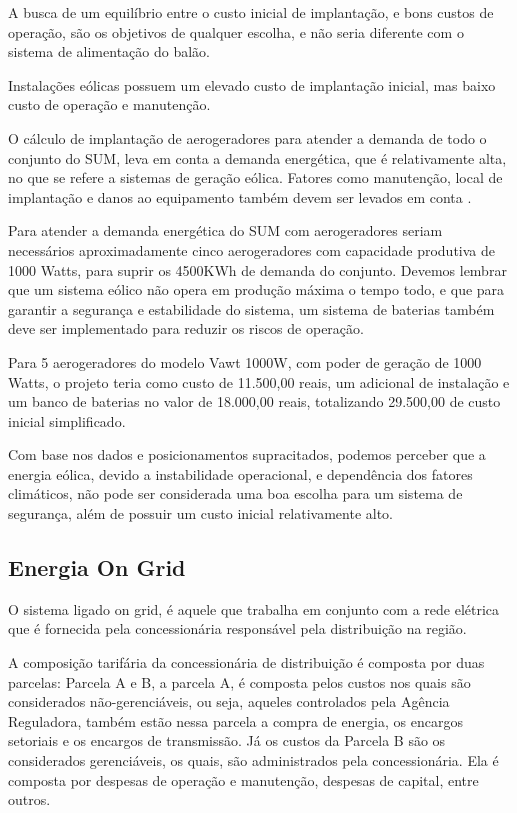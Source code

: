 A busca de um equilíbrio entre o custo inicial de implantação, e bons custos de operação, são os objetivos de qualquer escolha, e não seria diferente com o sistema de alimentação do balão.

Instalações eólicas possuem um elevado custo de implantação inicial, mas baixo custo de operação e manutenção.

O cálculo de implantação de aerogeradores para atender a demanda de todo o conjunto do SUM, leva em conta a demanda energética, que é relativamente alta, no que se refere a sistemas de geração eólica. Fatores como manutenção, local de implantação e danos ao equipamento também devem ser levados em conta \cite{eolica}.

Para atender a demanda energética do SUM com aerogeradores seriam necessários aproximadamente cinco aerogeradores com capacidade produtiva de 1000 Watts, para suprir os 4500KWh de demanda do conjunto. Devemos lembrar que um sistema eólico não opera em produção máxima o tempo todo, e que para garantir a segurança e estabilidade do sistema, um sistema de baterias também deve ser implementado para reduzir os riscos de operação.

Para 5 aerogeradores do modelo Vawt 1000W, com poder de geração de 1000 Watts, o projeto teria como custo de 11.500,00 reais, um adicional de instalação e um banco de baterias no valor de 18.000,00 reais, totalizando 29.500,00 de custo inicial simplificado\cite{aerogerador}.

Com base nos dados e posicionamentos supracitados, podemos perceber que a energia eólica, devido a instabilidade operacional, e dependência dos fatores climáticos, não pode ser considerada uma boa escolha para um sistema de segurança, além de possuir um custo inicial relativamente alto.

\subsection{Energia On Grid}

O sistema ligado on grid, é aquele que trabalha em conjunto com a rede elétrica que é fornecida pela concessionária responsável pela distribuição na região.

A composição tarifária da concessionária de distribuição é composta por duas parcelas: Parcela A e B, a parcela A, é composta pelos custos nos quais são considerados não-gerenciáveis, ou seja, aqueles controlados pela Agência Reguladora, também estão nessa parcela a compra de energia, os encargos setoriais e os encargos de transmissão. Já os custos da Parcela B são os considerados gerenciáveis, os quais, são administrados pela concessionária. Ela é composta por despesas de operação e manutenção, despesas de capital, entre outros.

